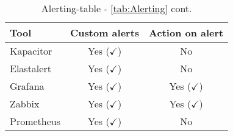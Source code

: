 \begin{table}[H]
	\centering
	\begin{tabular}{lcc}
		\hline
		Tool & Custom alerts & Action on alert \\
		\hline
		Kapacitor                    & Yes ($ \checkmark $)       & No\\
		Elastalert                   & Yes ($ \checkmark $) & No\\
		Grafana                      & Yes ($ \checkmark $)          & Yes ($ \checkmark $)\\
		Zabbix  & Yes ($ \checkmark $) & Yes ($ \checkmark $)\\
		Prometheus & Yes ($ \checkmark $) & No \\
		\hline 
	\end{tabular}
	\caption{Alerting-table - \cref{tab:Alerting} cont.}
	\label{tab:Alertingcont}
\end{table}